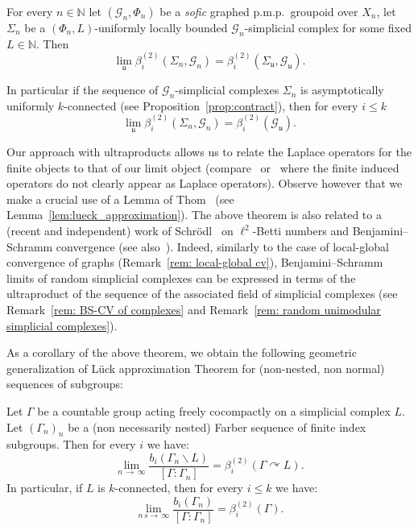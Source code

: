 \documentclass[AHL,Unicode,longabstracts,published]{cedram}
\newcommand{\Nmath}{\mathbb{N}}
\newcommand{\acting}{\curvearrowright}
\newcommand{\cg}{\mathcal{G}}
\newcommand{\ul}{\mathfrak{u}}
\newcommand{\pmp}{p.m.p.\ }
\begin{document}
\begin{theo}
For every $n\in\Nmath$ let $(\cg_n,\Phi_n)$ be a \emph{sofic} graphed \pmp groupoid over $X_n$, let $\Sigma_n$ be a $(\Phi_n,L)$-uniformly locally bounded $\cg_n$-simplicial complex for some fixed $L\in\Nmath$. Then
\[
\lim_\ul\beta^{(2)}_i\left(\Sigma_n, \cg_n\right)=\beta^{(2)}_i\left(\Sigma_\ul,\cg_\ul\right).
\]

In particular if the sequence of $\cg_n$-simplicial complexes $\Sigma_n$ is asymptotically uniformly $k$-connected (see Proposition~\ref{prop:contract}), then for every $i\leq k$
\[
\lim_\ul\beta^{(2)}_i\left(\Sigma_n, \cg_n\right)=\beta^{(2)}_i(\cg_\ul).
\]
\end{theo}


Our approach with ultraproducts allows us to relate the Laplace operators for the finite objects to that of our limit object (compare~\cite[Proposition~6.1]{2005-Elek-Szabo-hyperlinearity} or~\cite{thom08} where the finite induced operators do not clearly appear as Laplace operators). Observe however that we make a crucial use of a Lemma of Thom~\cite{thom08} (see Lemma~\ref{lem:lueck_approximation}). The above theorem is also related to a (recent and independent) work of Schr\"odl~\cite{Schrodel-L2-Betti-simpl-cplx-2018} on $\ell^2$-Betti numbers and Benjamini--Schramm convergence (see also~\cite{Elek-10-Betti-test}). Indeed, similarly to the case of local-global convergence of graphs (Remark~\ref{rem: local-global cv}), Benjamini--Schramm limits of random simplicial complexes can be expressed in terms of the ultraproduct of the sequence of the associated field of simplicial complexes (see Remark~\ref{rem: BS-CV of complexes} and Remark~\ref{rem: random unimodular simplicial complexes}).

As a corollary of the above theorem, we obtain the following geometric generalization of L\"uck approximation Theorem for (non-nested, non normal) sequences of subgroups:
\begin{coro}
Let $\Gamma$ be a countable group acting freely cocompactly on a simplicial complex $L$. Let $(\Gamma_n)_n$ be a (non necessarily nested) Farber sequence of finite index subgroups. Then for every $i$ we have:
\[
\lim\limits_{n\,\to\,\infty}\frac{b_i(\Gamma_n\backslash L)}{[\Gamma:\Gamma_n]}=\beta^{(2)}_i(\Gamma\acting L).
\]
In particular, if $L$ is $k$-connected, then for every $i\leq k$ we have:
\[
\lim\limits_{n\,s\to\,\infty}\frac{b_i(\Gamma_n)}{[\Gamma:\Gamma_n]}=\beta^{(2)}_i(\Gamma).
\]
\end{coro}
\end{document}
